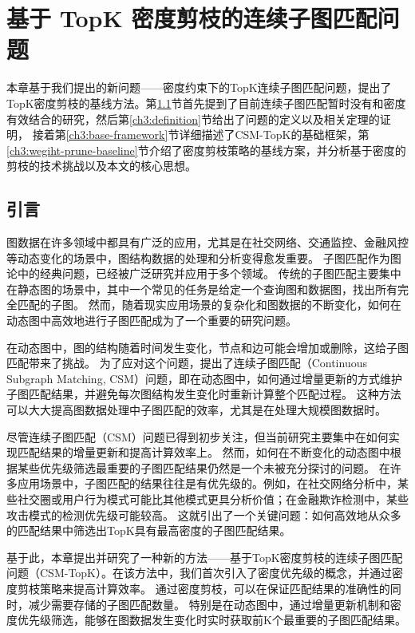 \chapter{基于 TopK 密度剪枝的连续子图匹配问题}
本章基于我们提出的新问题——密度约束下的TopK连续子图匹配问题，提出了TopK密度剪枝的基线方法。第\ref{ch3:introduction}节首先提到了目前连续子图匹配暂时没有和密度有效结合的研究，然后第\ref{ch3:definition}节给出了问题的定义以及相关定理的证明，
接着第\ref{ch3:base-framework}节详细描述了CSM-TopK的基础框架，第\ref{ch3:wegiht-prune-baseline}节介绍了密度剪枝策略的基线方案，并分析基于密度的剪枝的技术挑战以及本文的核心思想。
\section{引言}
\label{ch3:introduction}
图数据在许多领域中都具有广泛的应用，尤其是在社交网络、交通监控、金融风控等动态变化的场景中，图结构数据的处理和分析变得愈发重要。
子图匹配作为图论中的经典问题，已经被广泛研究并应用于多个领域。
传统的子图匹配主要集中在静态图的场景中，其中一个常见的任务是给定一个查询图和数据图，找出所有完全匹配的子图。
然而，随着现实应用场景的复杂化和图数据的不断变化，如何在动态图中高效地进行子图匹配成为了一个重要的研究问题。

在动态图中，图的结构随着时间发生变化，节点和边可能会增加或删除，这给子图匹配带来了挑战。
为了应对这个问题，提出了连续子图匹配（Continuous Subgraph Matching, CSM）问题，即在动态图中，如何通过增量更新的方式维护子图匹配结果，并避免每次图结构发生变化时重新计算整个匹配过程。
这种方法可以大大提高图数据处理中子图匹配的效率，尤其是在处理大规模图数据时。

尽管连续子图匹配（CSM）问题已得到初步关注，但当前研究主要集中在如何实现匹配结果的增量更新和提高计算效率上。
然而，如何在不断变化的动态图中根据某些优先级筛选最重要的子图匹配结果仍然是一个未被充分探讨的问题。
在许多应用场景中，子图匹配的结果往往是有优先级的。例如，在社交网络分析中，某些社交圈或用户行为模式可能比其他模式更具分析价值；在金融欺诈检测中，某些攻击模式的检测优先级可能较高。
这就引出了一个关键问题：如何高效地从众多的匹配结果中筛选出TopK具有最高密度的子图匹配结果。

基于此，本章提出并研究了一种新的方法——基于TopK密度剪枝的连续子图匹配问题（CSM-TopK）。在该方法中，我们首次引入了密度优先级的概念，并通过密度剪枝策略来提高计算效率。
通过密度剪枝，可以在保证匹配结果的准确性的同时，减少需要存储的子图匹配数量。
特别是在动态图中，通过增量更新机制和密度优先级筛选，能够在图数据发生变化时实时获取前K个最重要的子图匹配结果。
